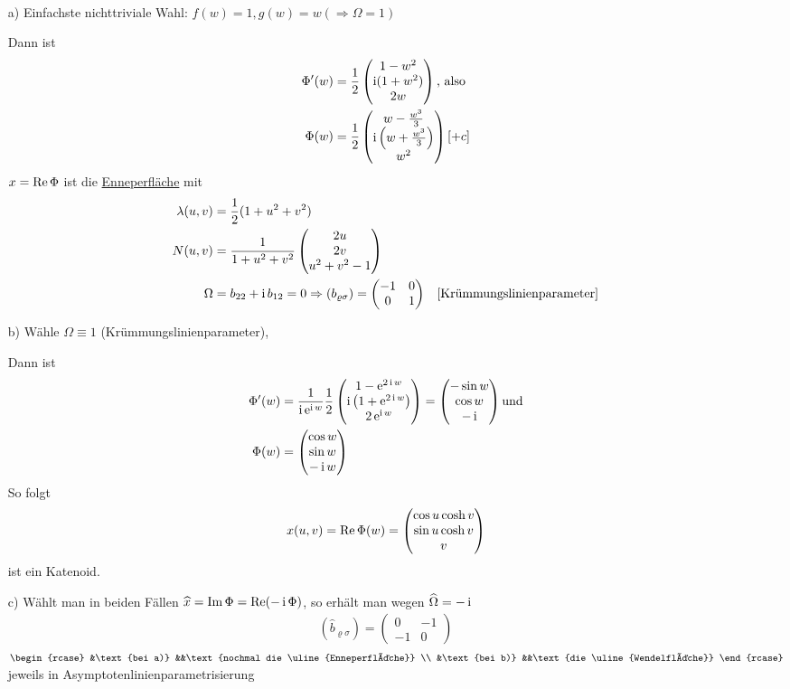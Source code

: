 \begin{bsp} \(\)
 \begin{enumerate}
  \item[a)] Einfachste nichttriviale Wahl: \(f(w) = 1, g(w) = w (\Rightarrow \Omega = 1)\) \par
  Dann ist 
  \begin{align*}
   \Phi'(w) &= \frac12 \begin{pmatrix} 1-w^2 \\ \operatorname{i}(1+w^2) \\ 2w \end{pmatrix}  \text{, also} \\
   \Phi(w) &= \frac12 \begin{pmatrix} w - \frac{w^3}{3} \\ \operatorname{i} \left(w+\frac{w^3}{3}\right) \\ w^2 \end{pmatrix}  [+ c]
  \end{align*}
  \(x = \operatorname{Re} \Phi\) ist die \uline{Enneperfläche} mit
  \begin{align*}
   \lambda(u,v) &= \frac{1}{2} (1 + u^2 + v^2) \\
   N(u,v) &= \frac{1}{1 + u^2 + v^2} \begin{pmatrix} 2u \\ 2v \\ u^2 + v^2 - 1 \end{pmatrix}  \\
   \Omega &= b_{22} + \operatorname{i} b_{12} = 0 \Rightarrow (b_{\varrho \sigma}) = \begin{pmatrix}
                                                                        -1 & 0 \\
                                                                        0 & 1
                                                                       \end{pmatrix} &\text{[Krümmungslinienparameter]}
  \end{align*}
  \item[b)] Wähle \(\Omega \equiv 1\) (Krümmungslinienparameter),  \par
  Dann ist
  \begin{align*}
   \Phi'(w) &= \frac{1}{\operatorname{i} \operatorname{e}^{\operatorname{i} w}} \frac{1}{2} \begin{pmatrix} 1 - \operatorname{e}^{2 \operatorname{i} w} \\ \operatorname{i} \left(1 + \operatorname{e}^{2 \operatorname{i} w}\right) \\ 2 \operatorname{e}^{\operatorname{i} w} \end{pmatrix}  = \begin{pmatrix} -\sin w \\ \cos w \\ -\operatorname{i} \end{pmatrix}  \text{und} \\
   \Phi(w) &= \begin{pmatrix} \cos w \\ \sin w \\ - \operatorname{i} w \end{pmatrix} 
  \end{align*}
  So folgt
  \begin{align*}
   x(u,v) = \operatorname{Re} \Phi(w) = \begin{pmatrix} \cos u \cosh v \\ \sin u \cosh v \\ v \end{pmatrix} 
  \end{align*}
  ist ein Katenoid.
  \item[c)] Wählt man in beiden Fällen \(\widehat x = \operatorname{Im} \Phi = \operatorname{Re} (- \operatorname{i} \Phi)\), so erhält man wegen \(\widehat \Omega = - \operatorname{i}\)
  \begin{align*}
   \left(\widehat b_{\varrho \sigma}\right) = \begin{pmatrix}
                                               0 & -1 \\
                                               -1 & 0
                                              \end{pmatrix}
  \end{align*}
\(\begin{rcase}
  &\text{bei a)} &&\text{nochmal die \uline{Enneperfläche}} \\
  &\text{bei b)} &&\text{die \uline{Wendelfläche}}
  \end{rcase}\) jeweils in Asymptotenlinienparametrisierung
 \end{enumerate}
\end{bsp}

